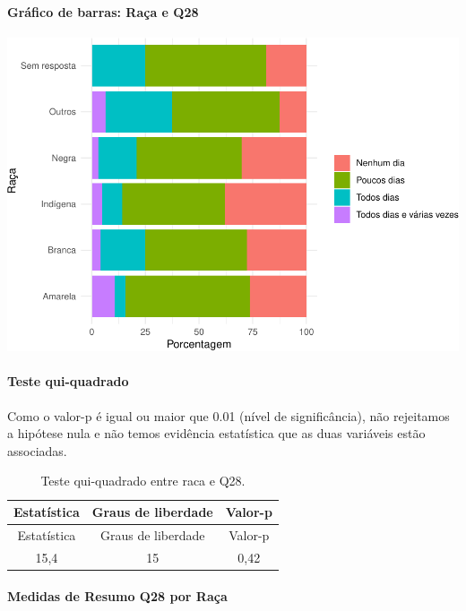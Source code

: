 \documentclass[]{article}
\let\oldparagraph\paragraph
\renewcommand{\paragraph}[1]{\oldparagraph{#1}\mbox{}}
\begin{document}
\hypertarget{gruxe1fico-de-barras-rauxe7a-e-q28}{%
\paragraph{Gráfico de barras: Raça e Q28}\label{gruxe1fico-de-barras-rauxe7a-e-q28}}

\begin{center}\includegraphics[width=0.75\linewidth]{relatorio_covid19_files/figure-latex/unnamed-chunk-869-1} \end{center}

\hypertarget{teste-qui-quadrado-75}{%
\paragraph{Teste qui-quadrado}\label{teste-qui-quadrado-75}}

Como o valor-p é igual ou maior que 0.01 (nível de significância), não rejeitamos a hipótese nula e não temos evidência estatística que as duas variáveis estão associadas.

\begin{longtable}[]{@{}ccc@{}}
\caption{\label{tab:unnamed-chunk-871}Teste qui-quadrado entre raca e Q28.}\tabularnewline
\toprule
Estatística & Graus de liberdade & Valor-p\tabularnewline
\midrule
\endfirsthead
\toprule
Estatística & Graus de liberdade & Valor-p\tabularnewline
\midrule
\endhead
15,4 & 15 & 0,42\tabularnewline
\bottomrule
\end{longtable}

\cleardoublepage

\hypertarget{medidas-de-resumo-q28-por-rauxe7a}{%
\paragraph{Medidas de Resumo Q28 por Raça}\label{medidas-de-resumo-q28-por-rauxe7a}}
\end{document}
